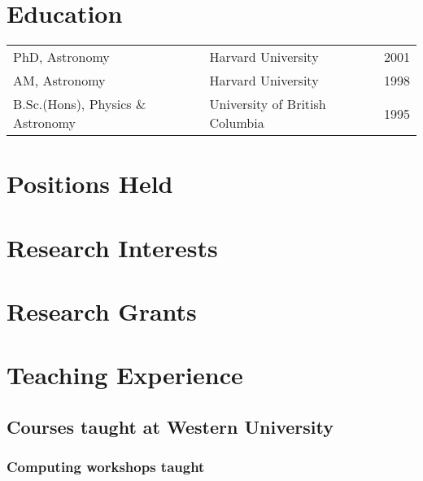 \documentclass[12pt]{article}
\begin{document}
\maketitle

\section{Education}
\begin{tabularx}{\textwidth}{lXr}
PhD, Astronomy & Harvard University & 2001\\
AM, Astronomy & Harvard University & 1998\\
B.Sc.(Hons),  Physics \& Astronomy & University of British Columbia&1995\\
\end{tabularx}

\section{Positions Held} 


\section{Research Interests}



\section{Research Grants}



\clearpage

\section{Teaching Experience}

\subsection{Courses taught at Western University}


\subsubsection{Computing workshops taught} %

\end{document}
